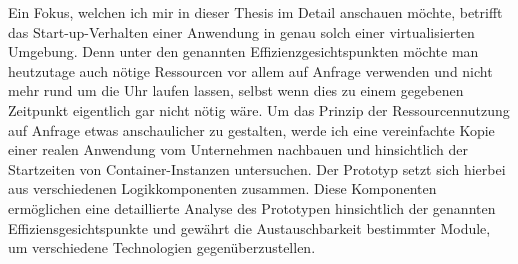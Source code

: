 Ein Fokus, welchen ich mir in dieser Thesis im Detail anschauen möchte, betrifft das Start-up-Verhalten einer Anwendung in genau solch einer virtualisierten Umgebung. Denn unter den genannten Effizienzgesichtspunkten möchte man heutzutage auch nötige Ressourcen vor allem auf Anfrage verwenden und nicht mehr rund um die Uhr laufen lassen, selbst wenn dies zu einem gegebenen Zeitpunkt eigentlich gar nicht nötig wäre. Um das Prinzip der Ressourcennutzung auf Anfrage etwas anschaulicher zu gestalten, werde ich eine vereinfachte Kopie einer realen Anwendung vom Unternehmen nachbauen und hinsichtlich der Startzeiten von Container-Instanzen untersuchen. Der Prototyp setzt sich hierbei aus verschiedenen Logikkomponenten zusammen. Diese Komponenten ermöglichen eine detaillierte Analyse des Prototypen hinsichtlich der genannten Effiziensgesichtspunkte und gewährt die Austauschbarkeit bestimmter Module, um verschiedene Technologien gegenüberzustellen.
